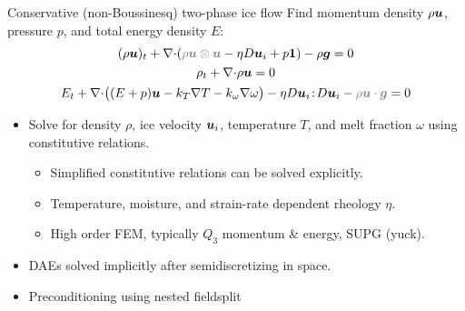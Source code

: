 \documentclass{beamer}
\begin{document}


\newcommand\smallterm[1]{{\color{gray} #1}}
\begin{frame}{Conservative (non-Boussinesq) two-phase ice flow}
  Find momentum density $\rho\bm u$, pressure $p$, and total energy density $E$:
  \begin{gather*}
    (\rho\uu)_t + \div (\smallterm{\rho\uu\otimes\uu} - \eta D\uu_i + p\bm 1) - \rho \bm g = 0 \\
    \rho_t + \div \rho\uu = 0 \\
    E_t + \div \big((E+p)\uu - k_T\nabla T - k_\omega\nabla\omega \big) - \eta D\uu_i\tcolon D\uu_i - \smallterm{\rho\uu\cdot\bm g} = 0
  \end{gather*}
\begin{itemize}
\item Solve for density $\rho$, ice velocity $\bm u_i$, temperature $T$, and melt fraction $\omega$ using constitutive relations.
  \begin{itemize}
  \item Simplified constitutive relations can be solved explicitly.
  \item Temperature, moisture, and strain-rate dependent rheology $\eta$.
  \item High order FEM, typically $Q_3$ momentum \& energy, SUPG (yuck).
  \end{itemize}
\item DAEs solved implicitly after semidiscretizing in space.
\item Preconditioning using nested fieldsplit
\end{itemize}
\end{frame}

\end{document}
